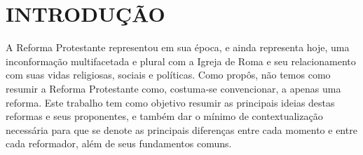 \documentclass[
    article,            %
	12pt,				%
	oneside,			%
	a4paper,			%
	chapter=TITLE,		%
	section=TITLE,		%
	english,			%
	french,				%
	spanish,			%
	brazil				%
	]{abntex2}
\renewcommand{\ABNTEXchapterfont}{\normalfont}
\begin{document}



\renewcommand{\imprimircapa}{%
  \begin{capa}%
    \center
    \ABNTEXchapterfont\large\imprimirinstituicao

    \ABNTEXchapterfont\large\imprimirautor

    \vfill
    \begin{center}
    \ABNTEXchapterfont\bfseries\large\imprimirtitulo
    \end{center}
    \vfill

    \large\imprimirlocal %

    \large\imprimirdata %

    \vspace*{1cm}
  \end{capa}
}
\imprimircapa

\imprimirfolhaderosto

\tableofcontents*
\cleardoublepage

\textual
\pagestyle{simple}


\section{INTRODUÇÃO}
A Reforma Protestante representou em sua época, e ainda representa hoje, uma inconformação multifacetada e plural com a Igreja de Roma e seu relacionamento com suas vidas religiosas, sociais e políticas. Como  propôs, não temos como resumir a Reforma Protestante como, costuma-se convencionar, a apenas uma reforma. Este trabalho tem como objetivo resumir as principais ideias destas reformas e seus proponentes, e também dar o mínimo de contextualização necessária para que se denote as principais diferenças entre cada momento e entre cada reformador, além de seus fundamentos comuns.
\end{document}
